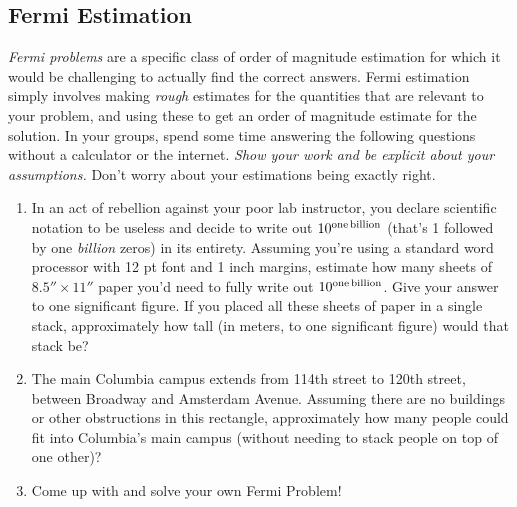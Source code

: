 \documentclass[11pt]{article}
\begin{document}
\subsection{Fermi Estimation}
{\it Fermi problems} are a specific class of order of magnitude estimation for which it would be challenging to actually find the correct answers. Fermi estimation simply involves making \textit{rough} estimates for the quantities that are relevant to your problem, and using these to get an order of magnitude estimate for the solution. In your groups, spend some time answering the following questions without a calculator or the internet. \textit{Show your work and be explicit about your assumptions.} Don't worry about your estimations being exactly right.
\begin{enumerate}
    \item In an act of rebellion against your poor lab instructor, you declare scientific notation to be useless and decide to write out $10^{\rm one \, billion}$ (that's 1 followed by one \emph{billion} zeros) in its entirety. Assuming you're using a standard word processor with 12 pt font and 1 inch margins, estimate how many sheets of $8.5'' \times 11''$ paper you'd need to fully write out $10^{\rm one \, billion}$. Give your answer to one significant figure. If you placed all these sheets of paper in a single stack, approximately how tall (in meters, to one significant figure) would that stack be?
    
    \item The main Columbia campus extends from 114th street to 120th street, between Broadway and Amsterdam Avenue. Assuming there are no buildings or other obstructions in this rectangle, approximately how many people could fit into Columbia's main campus (without needing to stack people on top of one other)?
    
    \item Come up with and solve your own Fermi Problem!
    
\end{enumerate}
\end{document}
